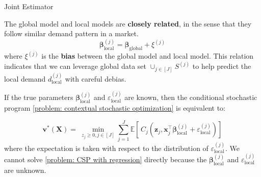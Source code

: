 \documentclass{beamer}
\newcommand{\mb}[1]{{\mathbf{#1}}}
\newcommand{\txrd}[1]{{\textcolor{sintefred}{\textbf{#1}}}}
\begin{document}
\begin{frame}{Joint Estimator}

The global model and local models are \txrd{closely related}, in the sense that they follow similar demand pattern in a market.
{
\large
\[
{\bm \beta}^{(j)}_{\text{local}} =  {\bm \beta}_{\text{global}}  + \xi^{(j)}
\]
}
where $\xi^{(j)}$ is the \txrd{bias} between the global model and local model.  This relation indicates that we can leverage global data set $\cup_{j \in [J]} S^{(j)}$ to help predict the local demand $d_{\text{local}}^{(j)}$ with careful debias.

\vspace{0.3cm}

If the true parameters $ {\bm \beta}^{(j)}_{\text{local}}$ and ${\varepsilon}^{(j)}_{\text{local}}$ are known, then the conditional stochastic program \eqref{problem: contextual stochastic optimization} is equivalent to:

{
\large
\begin{equation}
\bm v^*({\mb X}) = \ 
\min_{ z_j \geq 0, j\in[J]}
 \sum_{j=1}^J 
\mathbb{E} \left[\,C_j \left( \bm z_j, \bm x_j^\top  {\bm \beta}^{(j)}_{\text{local}} + \varepsilon_{\text{local}}^{(j)} \right) \right]
\label{problem: CSP with regression}
\end{equation}
}
where the expectation is taken with respect to the distribution of $\varepsilon_{\text{local}}^{(j)}$. We cannot solve \eqref{problem: CSP with regression} directly because the $ {\bm \beta}^{(j)}_{\text{local}}$ and $\varepsilon_{\text{local}}^{(j)}$ are unknown.

\end{frame}


\end{document}
